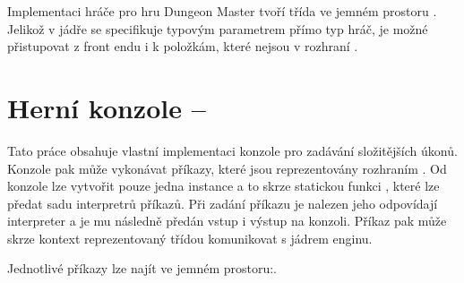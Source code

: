 Implementaci hráče pro hru Dungeon Master tvoří třída  ve jemném prostoru . Jelikož v jádře se specifikuje typovým parametrem 
přímo typ hráč, je možné přistupovat z front endu i k položkám, které nejsou v rozhraní .




\section{Herní konzole -- }
Tato práce obsahuje vlastní implementaci konzole pro zadávání složitějších úkonů. Konzole pak může vykonávat
příkazy, které jsou reprezentovány rozhraním . Od konzole lze vytvořit
pouze jedna instance a to skrze statickou funkci , které lze předat sadu
interpretrů příkazů. Při zadání příkazu je nalezen jeho odpovídají interpreter a je mu následně předán vstup 
i výstup na konzoli. Příkaz pak může skrze kontext reprezentovaný třídou  komunikovat s jádrem
enginu.

 Jednotlivé příkazy lze najít ve jemném prostoru:\newline {}.
